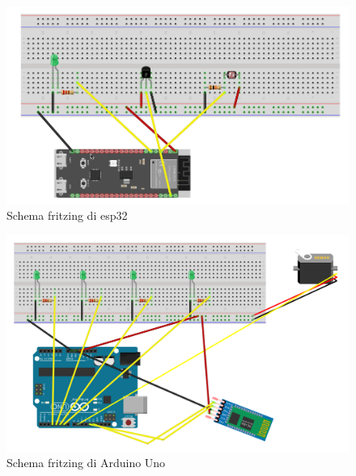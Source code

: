 \documentclass[a4paper, 12pt]{article}
\begin{document}
\begin{figure}[ht]
    \includegraphics[scale=0.49]{schema_esp32}
    \caption{Schema fritzing di esp32}
\end{figure}

\begin{figure}[ht]
    \includegraphics[scale=0.49]{schema_arduino}
    \caption{Schema fritzing di Arduino Uno}
\end{figure}
\end{document}
